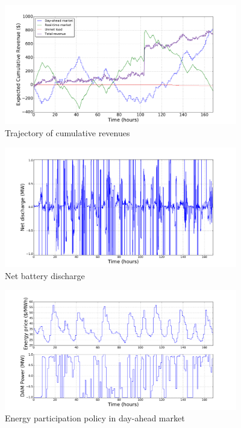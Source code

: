 \documentclass[11pt,twoside]{article}
\begin{document}
\begin{figure}[h!]
\begin{center}
\includegraphics[width=4in]{Figures/Plots/fullproblem_stoch/cumulative_rev_fp_st.pdf} \caption{Trajectory of cumulative revenues}\label{cumulative_rev_fp_st}\end{center}
\end{figure}
\begin{figure}[h!]
\begin{center}
\includegraphics[width=4in]{Figures/Plots/fullproblem_stoch/netpower_fp_st.pdf} \caption{Net battery discharge}\label{netpower_fp_st}\end{center}
\end{figure}
\begin{figure}[h!]
\begin{center}
\includegraphics[width=4in]{Figures/Plots/fullproblem_stoch/Pdam_fp_st.pdf} \caption{Energy participation policy in day-ahead market}\label{Pdam_fp_st}\end{center}
\end{figure}
\end{document}
